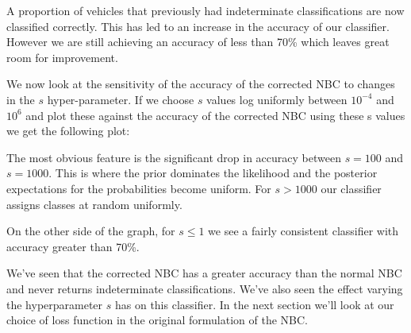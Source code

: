 A proportion of vehicles that previously had indeterminate classifications are now classified correctly.
This has led to an increase in the accuracy of our classifier.
However we are still achieving an accuracy of less than 70\% which leaves great room for improvement.

We now look at the sensitivity of the accuracy of the corrected NBC to changes in the $s$ hyper-parameter.
If we choose $s$ values log uniformly between $10^{-4}$ and $10^{6}$ and plot these against the accuracy of the corrected NBC using these s values we get the following plot:
\begin{center}
\end{center}

The most obvious feature is the significant drop in accuracy between $s=100$ and $s=1000$.
This is where the prior dominates the likelihood and the posterior expectations for the probabilities become uniform.
For $s>1000$ our classifier assigns classes at random uniformly.

On the other side of the graph, for $s \leq 1$ we see a fairly consistent classifier with accuracy greater than 70\%.

We've seen that the corrected NBC has a greater accuracy than the normal NBC and never returns indeterminate classifications.
We've also seen the effect varying the hyperparameter $s$ has on this classifier.
In the next section we'll look at our choice of loss function in the original formulation of the NBC.